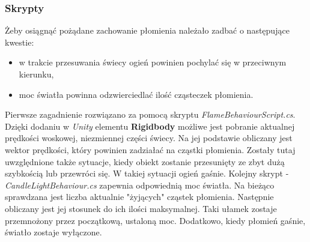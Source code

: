 \subsubsection{Skrypty}
Żeby osiągnąć pożądane zachowanie płomienia należało zadbać o następujące kwestie:
\begin{itemize}
	\item w trakcie przesuwania świecy ogień powinien pochylać się w przeciwnym kierunku,
	\item moc światła powinna odzwierciedlać ilość cząsteczek płomienia.
\end{itemize}
Pierwsze zagadnienie rozwiązano za pomocą skryptu \textit{FlameBehaviourScript.cs}. Dzięki dodaniu w \textit{Unity} elementu \textbf{Rigidbody} możliwe jest pobranie aktualnej prędkości woskowej, niezmiennej części świecy.  Na jej podstawie obliczany jest wektor prędkości, który powinien zadziałać na cząstki płomienia. Zostały tutaj uwzględnione także sytuacje, kiedy obiekt zostanie przesunięty ze zbyt dużą szybkością lub przewróci się. W takiej sytuacji ogień gaśnie.
Kolejny skrypt - \textit{CandleLightBehaviour.cs} zapewnia odpowiednią moc światła. Na bieżąco sprawdzana jest liczba aktualnie "żyjących" cząstek płomienia. Następnie obliczany jest jej stosunek do ich ilości maksymalnej. Taki ułamek zostaje przemnożony przez początkową, ustaloną moc. Dodatkowo, kiedy płomień gaśnie, światło zostaje wyłączone.